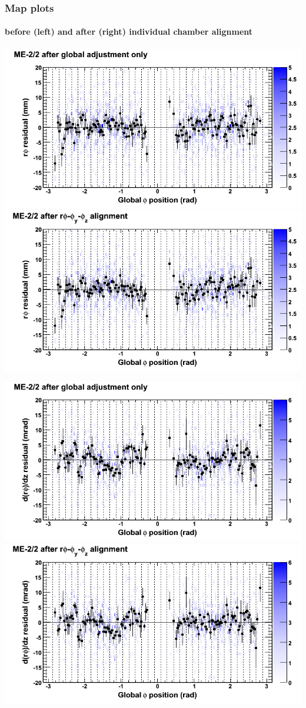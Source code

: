 \documentclass[compress]{beamer}
\begin{document}
\begin{frame}
\frametitle{Map plots}
\framesubtitle{before (left) and after (right) individual chamber alignment}
\includegraphics[width=0.5\linewidth]{ringmapplots_3dof/before_CSCvsphi_mem22_x.png} \includegraphics[width=0.5\linewidth]{ringmapplots_3dof/after_CSCvsphi_mem22_x.png}

\includegraphics[width=0.5\linewidth]{ringmapplots_3dof/before_CSCvsphi_mem22_dxdz.png} \includegraphics[width=0.5\linewidth]{ringmapplots_3dof/after_CSCvsphi_mem22_dxdz.png}
\end{frame}
\end{document}
